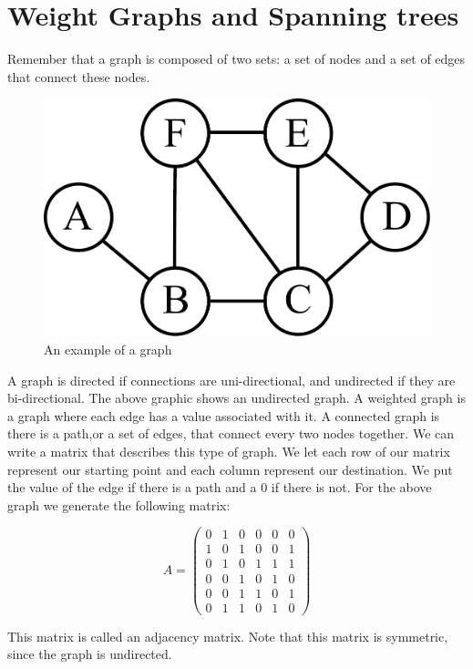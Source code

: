 \label{Ch:Kruskal}


\section*{Weight Graphs and Spanning trees}


Remember that a graph is composed of two sets: a set of nodes and a set of edges that connect these nodes. 

\begin{figure}[H]
\includegraphics[width = .4\textwidth]{graph1.pdf}
\caption{An example of a graph}
\end{figure}

A graph is directed if connections are uni-directional, and undirected if they are bi-directional. The above graphic shows an undirected graph. A weighted graph is a graph where each edge has a value associated with it. A connected graph is there is a path,or a set of edges, that connect every two nodes together. We can write a matrix that describes this type of graph. We let each row of our matrix represent our starting point and each column represent our destination. We put the value of the edge if there is a path and a 0 if there is not. For the above graph we generate the following matrix:

\[
A = \begin{pmatrix}
0 & 1 & 0 & 0 & 0 & 0\\
1 & 0 & 1 & 0 & 0 & 1\\
0 & 1 & 0 & 1 & 1 & 1\\
0 & 0 & 1 & 0 & 1 & 0\\
0 & 0 & 1 & 1 & 0 & 1\\
0 & 1 & 1 & 0 & 1 & 0
\end{pmatrix}
\]

This matrix is called an adjacency matrix. Note that this matrix is symmetric, since the graph is undirected. 

